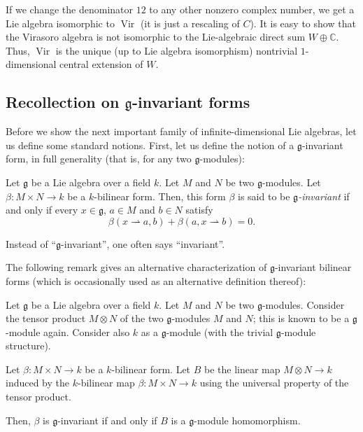 \documentclass[etingof-lie.tex]{subfiles}
\begin{document}
If we change the denominator $12$ to any other nonzero complex number, we get
a Lie algebra isomorphic to $\operatorname*{Vir}$ (it is just a rescaling of
$C$). It is easy to show that the Virasoro algebra is not isomorphic to the
Lie-algebraic direct sum $W\oplus\mathbb{C}$. Thus, $\operatorname*{Vir}$ is
the unique (up to Lie algebra isomorphism) nontrivial $1$-dimensional central
extension of $W$.

\subsection{Recollection on \texorpdfstring{$\mathfrak{g}$}{g}-invariant
forms}

Before we show the next important family of infinite-dimensional Lie algebras,
let us define some standard notions. First, let us define the notion of a
$\mathfrak{g}$-invariant form, in full generality (that is, for any two
$\mathfrak{g}$-modules):

\begin{definition}
\label{def.g-invar}Let $\mathfrak{g}$ be a Lie algebra over a field $k$. Let
$M$ and $N$ be two $\mathfrak{g}$-modules. Let $\beta:M\times N\rightarrow k$
be a $k$-bilinear form. Then, this form $\beta$ is said to be $\mathfrak{g}%
$\textit{-invariant} if and only if every $x\in\mathfrak{g}$, $a\in M$ and
$b\in N$ satisfy%
\[
\beta\left(  x\rightharpoonup a,b\right)  +\beta\left(  a,x\rightharpoonup
b\right)  =0.
\]


Instead of ``$\mathfrak{g}$-invariant'', one often says ``invariant''.
\end{definition}

The following remark gives an alternative characterization of $\mathfrak{g}%
$-invariant bilinear forms (which is occasionally used as an alternative
definition thereof):

\begin{remark}
\label{rmk.g-invar}Let $\mathfrak{g}$ be a Lie algebra over a field $k$. Let
$M$ and $N$ be two $\mathfrak{g}$-modules. Consider the tensor product
$M\otimes N$ of the two $\mathfrak{g}$-modules $M$ and $N$; this is known to
be a $\mathfrak{g}$-module again. Consider also $k$ as a $\mathfrak{g}$-module
(with the trivial $\mathfrak{g}$-module structure).

Let $\beta:M\times N\rightarrow k$ be a $k$-bilinear form. Let $B$ be the
linear map $M\otimes N\rightarrow k$ induced by the $k$-bilinear map
$\beta:M\times N\rightarrow k$ using the universal property of the tensor product.

Then, $\beta$ is $\mathfrak{g}$-invariant if and only if $B$ is a
$\mathfrak{g}$-module homomorphism.
\end{remark}
\end{document}
